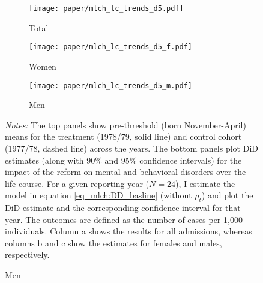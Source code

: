 \begin{landscape}
	\vspace*{\fill}
	\begin{figure}[H]\centering
		\caption{Life-course approach for mental and behavioral disorders}\label{fig_mlch: lc_d5_frg_DD}
		\begin{subfigure}[h]{0.31\linewidth}\centering\caption{Total}
			\texttt{[image: paper/mlch\_lc\_trends\_d5.pdf]}
		\end{subfigure}
		\begin{subfigure}[h]{0.31\linewidth}\centering\caption{Women}
			\texttt{[image: paper/mlch\_lc\_trends\_d5\_f.pdf]}
		\end{subfigure}
		\begin{subfigure}[h]{0.31\linewidth}\centering\caption{Men}
			\texttt{[image: paper/mlch\_lc\_trends\_d5\_m.pdf]}
		\end{subfigure}
		\scriptsize
		\begin{minipage}{\linewidth}
			\emph{Notes:} The top panels show pre-threshold (born November-April) means for the treatment (1978/79, solid line) and control cohort (1977/78, dashed line) across the years. The bottom panels plot DiD estimates (along with 90\% and 95\% confidence intervals) for the impact of the reform on mental and behavioral disorders over the life-course. For a given reporting year ($N=24$), I estimate the model in equation \ref{eq_mlch:DD_basline} (without $\rho_t$) and plot the DiD estimate and the corresponding confidence interval for that year. The outcomes are defined as the number of cases per 1,000 individuals. Column a shows the results for all admissions, whereas columns b and c show the estimates for females and males, respectively.
		\end{minipage}
	\end{figure}
	\vspace*{\fill}\clearpage
\end{landscape}
\restoregeometry
